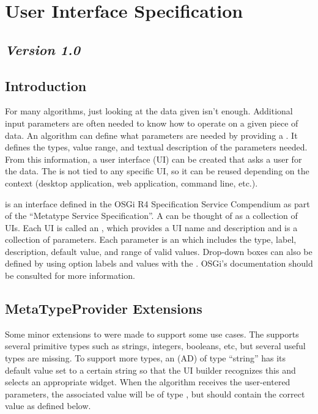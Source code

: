 \section{User Interface Specification}
\label{GUISpec}
\subsection*{\textit{Version 1.0}}
\subsection{Introduction}

For many algorithms, just looking at the data given isn't enough. Additional
input parameters are often needed to know how to operate on a given piece of
data. An algorithm can define what parameters are needed by providing a
. It defines the types, value range, and textual
description of the parameters needed. From this information, a user interface
(UI) can be created that asks a user for the data. The 
is not tied to any specific UI, so it can be reused depending on the context
(desktop application, web application, command line, etc.).

 is an interface defined in the OSGi R4 Specification
Service Compendium as part of the ``Metatype Service Specification''. A
 can be thought of as a collection of UIs. Each UI is
called an , which provides a UI name and description
and is a collection of parameters. Each parameter is an
 which includes the type, label, description, default
value, and range of valid values. Drop-down boxes can also be defined by using
option labels and values with the . OSGi's
documentation should be consulted for more information.

\subsection{MetaTypeProvider Extensions}

Some minor extensions to  were made to support some use
cases. The  supports several primitive types such as
strings, integers, booleans, etc, but several useful types are missing. To
support more types, an  (AD) of type ``string'' has
its default value set to a certain string so that the UI builder recognizes this
and selects an appropriate widget. When the algorithm receives the user-entered
parameters, the associated value will be of type , but
should contain the correct value as defined below.

